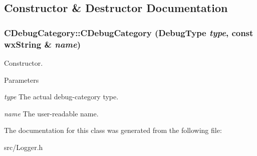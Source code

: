 \subsection{Constructor \& Destructor Documentation}
\subsubsection[{CDebugCategory}]{\setlength{\rightskip}{0pt plus 5cm}CDebugCategory::CDebugCategory (DebugType {\em type}, \/  const wxString \& {\em name})\hspace{0.3cm}{\ttfamily  [inline]}}\label{classCDebugCategory_a0823321aa12352bd18ca67296ac6d6a2}


Constructor. 
\begin{DoxyParams}{Parameters}
\item[{\em type}]The actual debug-\/category type. \item[{\em name}]The user-\/readable name. \end{DoxyParams}


The documentation for this class was generated from the following file:\begin{DoxyCompactItemize}
\item 
src/Logger.h\end{DoxyCompactItemize}
